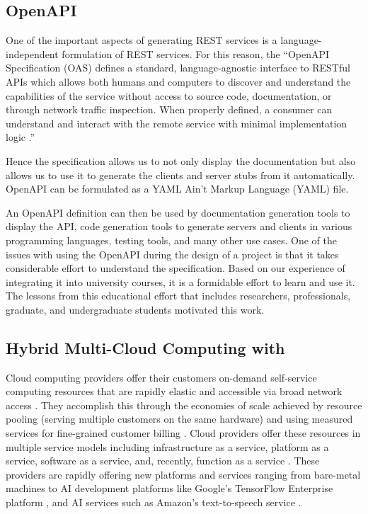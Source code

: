 \subsection{OpenAPI}

One of the important aspects of generating REST services is a language-independent formulation of REST services. For this reason, the ``OpenAPI Specification (OAS) defines a standard, language-agnostic interface to RESTful APIs which allows both humans and computers to discover and understand the capabilities of the service without access to source code, documentation, or through network traffic inspection. When properly defined, a consumer can understand and interact with the remote service with minimal implementation logic \cite{openapi}.''

Hence the specification allows us to not only display the documentation but also allows us to use it to generate the clients and server stubs from it automatically. OpenAPI can be formulated as a YAML Ain't Markup Language (YAML) \cite{www-yaml} file. 

An OpenAPI definition can then be used by documentation generation tools to display the API, code generation tools to generate servers and clients in various programming languages, testing tools, and many other use cases. One of the issues with using the OpenAPI during the design of a project is that it takes considerable effort to understand the specification. Based on our experience of integrating it into university courses, it is a formidable effort to learn and use it. The lessons from this educational effort that includes researchers, professionals, graduate, and undergraduate students motivated this work.

\subsection{Hybrid Multi-Cloud Computing with \Cloudmesh}\label{cloudmesh}

Cloud computing providers offer their customers on-demand self-service
computing resources that are rapidly elastic and accessible via broad
network access .
They accomplish this through the economies of scale achieved by resource
pooling (serving multiple customers on the same hardware) and using
measured services for fine-grained customer billing \cite{nist-cloud-standard}.
Cloud providers offer these resources in multiple service models
including infrastructure as a service, platform as a service, software
as a service, and, recently, function as a service
\cite{nist-cloud-standard}.
These providers are rapidly offering new platforms and services ranging
from bare-metal machines to AI development platforms like Google's
TensorFlow Enterprise platform \cite{www-tensorflow-enterprise}, and AI services
such as Amazon's text-to-speech service \cite{amazon-polly}.

